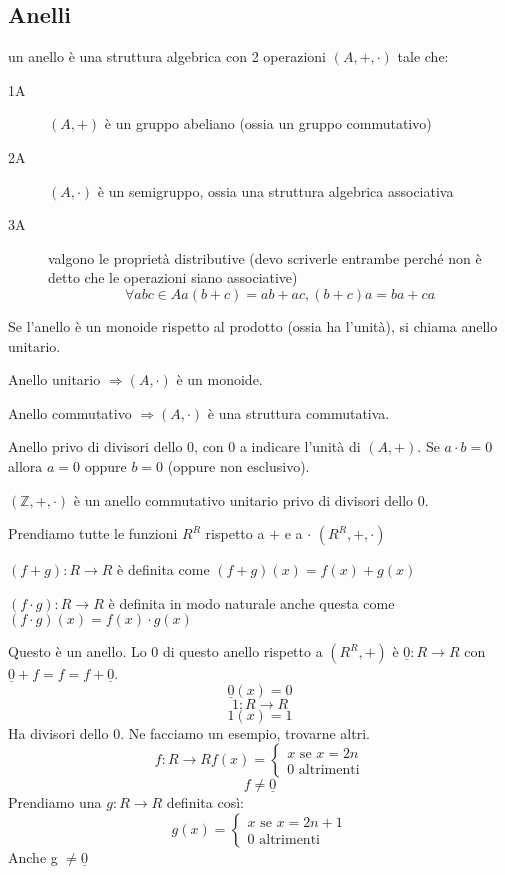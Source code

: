 \subsection{Anelli}

un anello \`e una struttura algebrica con 2 operazioni $(A, +, \cdot)$ tale che:

\begin{description}
    \item[1A] $(A, +)$ \`e un gruppo abeliano (ossia un gruppo commutativo)
    \item[2A] $(A, \cdot)$ \`e un semigruppo, ossia una struttura algebrica associativa
    \item[3A] valgono le propriet\`a distributive (devo scriverle entrambe perch\'e non \`e detto che le operazioni siano associative) %
    \[
    \forall a b c \in A a (b + c) = ab + ac, (b + c) a = b a + c a
    \]
\end{description}

Se l'anello \`e un monoide rispetto al prodotto (ossia ha l'unit\`a), si chiama anello unitario.

Anello unitario $\Rightarrow (A, \cdot)$ \`e un monoide.

Anello commutativo $\Rightarrow (A, \cdot)$ \`e una struttura commutativa.

Anello privo di divisori dello 0, con 0 a indicare l'unit\`a di $(A, +)$. Se $a \cdot b = 0$ allora $a = 0$ oppure $b = 0$ (oppure non esclusivo).

$(\mathbb{Z}, +, \cdot)$ \`e un anello commutativo unitario privo di divisori dello 0.

Prendiamo tutte le funzioni $R^R$ rispetto a $+$ e a $\cdot$ $(R^R, +, \cdot)$

$(f + g) : R \to R$ \`e definita come $(f + g) (x) = f(x) + g(x)$ 

$(f \cdot g) : R \to R$ \`e definita in modo naturale anche questa come $(f \cdot g) (x) = f(x) \cdot g(x)$

Questo \`e un anello. Lo 0 di questo anello rispetto a $(R^R, +)$ \`e $\underline{0} : R \to R$ con $\underline{0} + f = f = f + \underline{0}$.
\[
\underline{0} (x) = 0
\]
\[
1 : R \to R
\]
\[
1(x) = 1
\]
Ha divisori dello 0. Ne facciamo un esempio, trovarne altri.
\[
f : R \to R
f(x) =
\begin{cases}
x \text{ se } x = 2n \\
0 \text{ altrimenti}
\end{cases}
\]
\[
f \neq \underline{0}
\]
Prendiamo una $g : R \to R$ definita cos\`i:
\[
g(x) =
\begin{cases}
x \text{ se } x = 2n + 1 \\
0 \text{ altrimenti}
\end{cases}
\]
Anche g $\neq \underline{0}$

